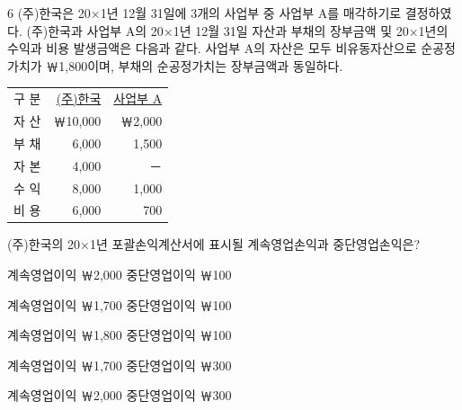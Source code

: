 \begin{question}{6}
(주)한국은 20×1년 12월 31일에 3개의 사업부 중 사업부 A를 매각하기로 결정하였다. (주)한국과 사업부 A의 20×1년 12월 31일 자산과 부채의 장부금액 및 20×1년의 수익과 비용 발생금액은 다음과 같다. 사업부 A의 자산은 모두 비유동자산으로 순공정가치가 ￦1,800이며, 부채의 순공정가치는 장부금액과 동일하다.
\begin{center}
\small
\begin{tabular}{|c r r|}
\hline
구 분 & \uline{(주)한국} & \uline{사업부 A} \\
자 산 & ￦10,000 & ￦2,000 \\
부 채 & 6,000 & 1,500 \\
자 본 & 4,000 & － \\
수 익 & 8,000 & 1,000 \\
비 용 & 6,000 & 700 \\
\hline
\end{tabular}
\end{center}
(주)한국의 20×1년 포괄손익계산서에 표시될 계속영업손익과 중단영업손익은? \par
\begin{choices}
  \item 계속영업이익 ￦2,000 중단영업이익 ￦100
  \item 계속영업이익 ￦1,700 중단영업이익 ￦100
  \item 계속영업이익 ￦1,800 중단영업이익 ￦100
  \item 계속영업이익 ￦1,700 중단영업이익 ￦300
  \item 계속영업이익 ￦2,000 중단영업이익 ￦300
\end{choices}
\end{question}
